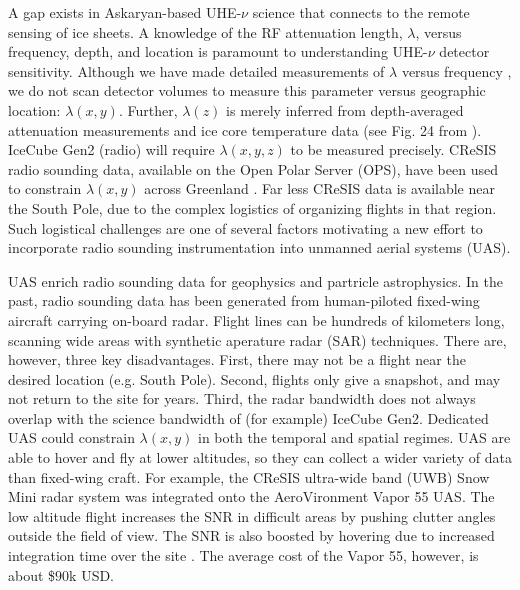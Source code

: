 \documentclass[../../main.tex]{subfiles}
\begin{document}
A gap exists in Askaryan-based UHE-$\nu$ science that connects to the remote sensing of ice sheets.  A knowledge of the RF attenuation length, $\lambda$, versus frequency, depth, and location is paramount to understanding UHE-$\nu$ detector sensitivity.  Although we have made detailed measurements of $\lambda$ versus frequency \cite{10.3189/2015jog14j214,10.3189/2015jog15j057,barwick_besson_gorham_saltzberg_2005}, we do not scan detector volumes to measure this parameter versus geographic location: $\lambda(x,y)$.  Further, $\lambda(z)$ is merely inferred from depth-averaged attenuation measurements and ice core temperature data (see Fig. 24 from \cite{10.1016/j.astropartphys.2011.11.010}). IceCube Gen2 (radio) will require $\lambda(x,y,z)$ to be measured precisely.  CReSIS radio sounding data, available on the Open Polar Server (OPS), have been used to constrain $\lambda(x,y)$ across Greenland \cite{10.1002/2015rs005849}.  Far less CReSIS data is available near the South Pole, due to the complex logistics of organizing flights in that region.  Such logistical challenges are one of several factors motivating a new effort to incorporate radio sounding instrumentation into unmanned aerial systems (UAS). \\ \vspace{2.5mm}

UAS enrich radio sounding data for geophysics and partricle astrophysics.  In the past, radio sounding data has been generated from human-piloted fixed-wing aircraft carrying on-board radar.  Flight lines can be hundreds of kilometers long, scanning wide areas with synthetic aperature radar (SAR) techniques.  There are, however, three key disadvantages.  First, there may not be a flight near the desired location (e.g. South Pole).  Second, flights only give a snapshot, and may not return to the site for years.  Third, the radar bandwidth does not always overlap with the science bandwidth of (for example) IceCube Gen2.  Dedicated UAS could constrain $\lambda(x,y)$ in both the temporal and spatial regimes.  UAS are able to hover and fly at lower altitudes, so they can collect a wider variety of data than fixed-wing craft.  For example, the CReSIS ultra-wide band (UWB) Snow Mini radar system was integrated onto the AeroVironment Vapor 55 UAS.  The low altitude flight increases the SNR in difficult areas by pushing clutter angles outside the field of view.  The SNR is also boosted by hovering due to increased integration time over the site \cite{arnold_2020}. The average cost of the Vapor 55, however, is about \$$90$k USD.  \\ \vspace{2.5mm}
\end{document}
